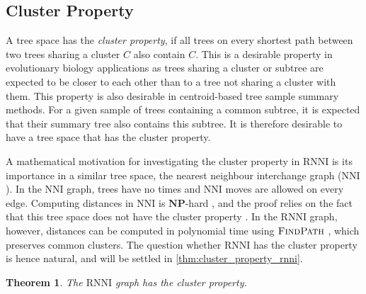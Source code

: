 \documentclass[11pt]{amsart}
\newtheorem{theorem}{Theorem}
\newcommand{\rnni}{\mathrm{RNNI}}
\newcommand{\findpath}{\textsc{FindPath}}
\newcommand{\nni}{\mathrm{NNI}}
\newcommand{\np}{\mathbf{NP}}
\newcommand{\summary}[1]{} %
\begin{document}
\subsection{Cluster Property}
\label{section:cluster_property}
\summary{Definition of Cluster Property and why it is relevant (a bit of bio).}
A tree space has the \emph{cluster property}, if all trees on every shortest path between two trees sharing a cluster $C$ also contain $C$.
This is a desirable property in evolutionary biology applications as trees sharing a cluster or subtree are expected to be closer to each other than to a tree not sharing a cluster with them.
This property is also desirable in centroid-based tree sample summary methods.
For a given sample of trees containing a common subtree, it is expected that their summary tree also contains this subtree.
It is therefore desirable to have a tree space that has the cluster property.

\summary{Cluster property in $\nni$ and its connection to the complexity result.}
A mathematical motivation for investigating the cluster property in $\rnni$ is its importance in a similar tree space, the nearest neighbour interchange graph ($\nni$).
In the $\nni$ graph, trees have no times and $\nni$ moves are allowed on every edge.
Computing distances in $\nni$ is $\np$-hard \autocite{Dasgupta2000-xa}, and the proof relies on the fact that this tree space does not have the cluster property \autocite{Li1996-zw}.
In the $\rnni$ graph, however, distances can be computed in polynomial time using $\findpath$ \autocite{Collienne2020-iu}, which preserves common clusters.
The question whether $\rnni$ has the cluster property is hence natural, and will be settled in \autoref{thm:cluster_property_rnni}.

\summary{$\rnni$ has the cluster property.}
\begin{theorem}
	The $\rnni$ graph has the cluster property.
	\label{thm:cluster_property_rnni}
\end{theorem}
\end{document}
